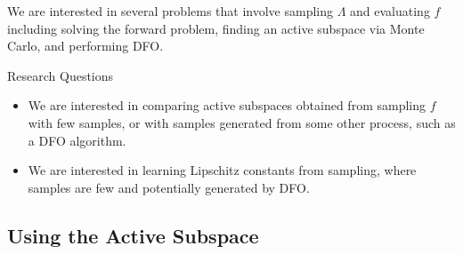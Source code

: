 \documentclass[11pt]{beamer}
\begin{document}
\begin{frame}

We are interested in several problems that involve sampling $\Lambda$ and evaluating $f$ including solving the forward problem, finding an active subspace via Monte Carlo, and performing DFO.

\begin{block}{Research Questions}
	
	\begin{itemize}
	
		\item We are interested in comparing active subspaces obtained from sampling $f$ with few samples, or with samples generated from some other process, such as a DFO algorithm.
		
		\item 	We are interested in learning Lipschitz constants \footnotemark[1] \footnotemark[2] from sampling, where samples are few and potentially generated by DFO.
	
	\end{itemize}


\end{block}


\end{frame}


\subsection{Using the Active Subspace}
\end{document}
